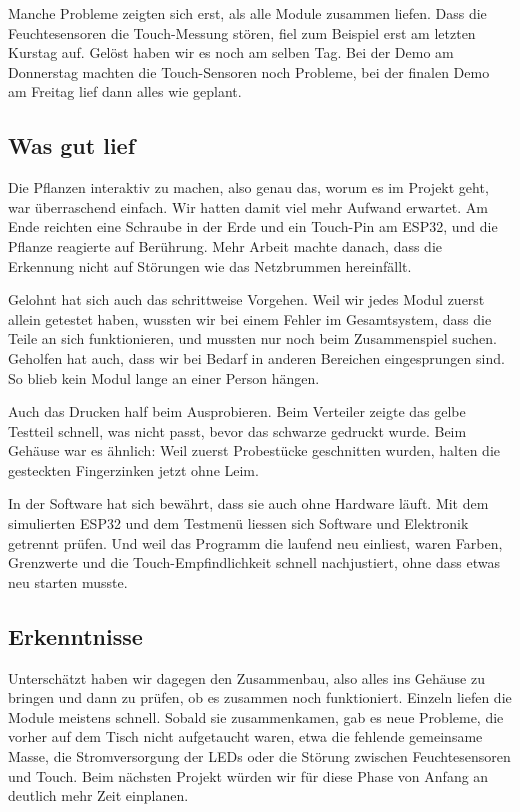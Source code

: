 \documentclass[11pt,a4paper]{article}
\begin{document}
Manche Probleme zeigten sich erst, als alle Module zusammen liefen. Dass die Feuchtesensoren die Touch-Messung stören, fiel zum Beispiel erst am letzten Kurstag auf. Gelöst haben wir es noch am selben Tag. Bei der Demo am Donnerstag machten die Touch-Sensoren noch Probleme, bei der finalen Demo am Freitag lief dann alles wie geplant.

\subsection{Was gut lief}

Die Pflanzen interaktiv zu machen, also genau das, worum es im Projekt geht, war überraschend einfach. Wir hatten damit viel mehr Aufwand erwartet. Am Ende reichten eine Schraube in der Erde und ein Touch-Pin am ESP32, und die Pflanze reagierte auf Berührung. Mehr Arbeit machte danach, dass die Erkennung nicht auf Störungen wie das Netzbrummen hereinfällt.

Gelohnt hat sich auch das schrittweise Vorgehen. Weil wir jedes Modul zuerst allein getestet haben, wussten wir bei einem Fehler im Gesamtsystem, dass die Teile an sich funktionieren, und mussten nur noch beim Zusammenspiel suchen. Geholfen hat auch, dass wir bei Bedarf in anderen Bereichen eingesprungen sind. So blieb kein Modul lange an einer Person hängen.

Auch das Drucken half beim Ausprobieren. Beim Verteiler zeigte das gelbe Testteil schnell, was nicht passt, bevor das schwarze gedruckt wurde. Beim Gehäuse war es ähnlich: Weil zuerst Probestücke geschnitten wurden, halten die gesteckten Fingerzinken jetzt ohne Leim.

In der Software hat sich bewährt, dass sie auch ohne Hardware läuft. Mit dem simulierten ESP32 und dem Testmenü liessen sich Software und Elektronik getrennt prüfen. Und weil das Programm die  laufend neu einliest, waren Farben, Grenzwerte und die Touch-Empfindlichkeit schnell nachjustiert, ohne dass etwas neu starten musste.

\subsection{Erkenntnisse}

Unterschätzt haben wir dagegen den Zusammenbau, also alles ins Gehäuse zu bringen und dann zu prüfen, ob es zusammen noch funktioniert. Einzeln liefen die Module meistens schnell. Sobald sie zusammenkamen, gab es neue Probleme, die vorher auf dem Tisch nicht aufgetaucht waren, etwa die fehlende gemeinsame Masse, die Stromversorgung der LEDs oder die Störung zwischen Feuchtesensoren und Touch. Beim nächsten Projekt würden wir für diese Phase von Anfang an deutlich mehr Zeit einplanen.
\end{document}
